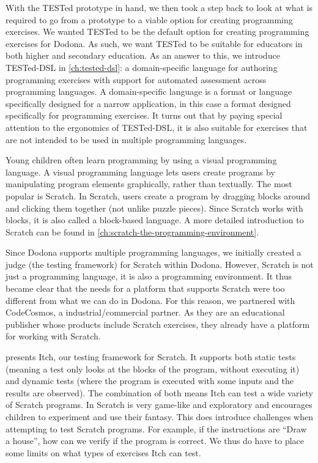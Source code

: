 \documentclass[main]{subfiles}
\begin{document}
With the TESTed prototype in hand, we then took a step back to look at what is required to go from a prototype to a viable option for creating programming exercises.
We wanted TESTed to be the default option for creating programming exercises for Dodona.
As such, we want TESTed to be suitable for educators in both higher and secondary education.
As an answer to this, we introduce TESTed-DSL in \cref{ch:tested-dsl}: a domain-specific language for authoring programming exercises with support for automated assessment across programming languages.
A domain-specific language is a format or language specifically designed for a narrow application, in this case a format designed specifically for programming exercises.
It turns out that by paying special attention to the ergonomics of TESTed-DSL, it is also suitable for exercises that are not intended to be used in multiple
programming languages.

Young children often learn programming by using a visual programming language.
A visual programming language lets users create programs by manipulating program elements graphically, rather than textually.
The most popular is Scratch.
In Scratch, users create a program by dragging blocks around and clicking them together (not unlike puzzle pieces).
Since Scratch works with blocks, it is also called a block-based language.
A more detailed introduction to Scratch can be found in \cref{ch:scratch-the-programming-environment}.

Since Dodona supports multiple programming languages, we initially created a judge (the testing framework) for Scratch within Dodona.
However, Scratch is not just a programming language, it is also a programming environment.
It thus became clear that the needs for a platform that supports Scratch were too different from what we can do in Dodona.
For this reason, we partnered with CodeCosmos, a industrial/commercial partner.
As they are an educational publisher whose products include Scratch exercises, they already have a platform for working with Scratch.

 presents Itch, our testing framework for Scratch.
It supports both static tests (meaning a test only looks at the blocks of the program, without executing it) and dynamic tests (where the program is executed with some inputs and the results are observed).
The combination of both means Itch can test a wide variety of Scratch programs.
In Scratch is very game-like and exploratory and encourages children to experiment and use their fantasy.
This does introduce challenges when attempting to test Scratch programs.
For example, if the instructions are ``Draw a house'', how can we verify if the program is correct.
We thus do have to place some limits on what types of exercises Itch can test.
\end{document}

